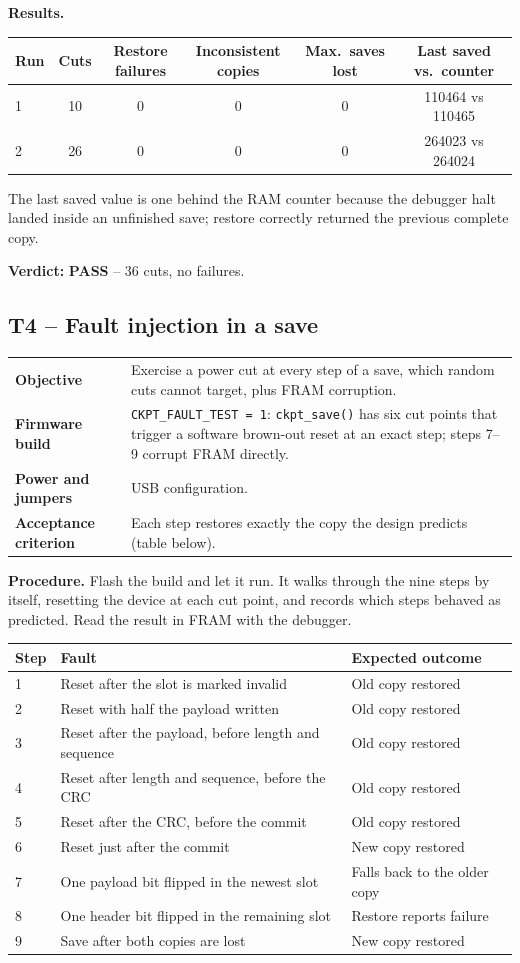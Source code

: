 \documentclass[11pt,a4paper]{article}
\makeatletter
\newcommand{\code}[1]{\texttt{#1}}
\newcommand{\pass}{\textbf{\textcolor{green!45!black}{PASS}}}
\newcommand{\testcase}[7]{%
  \subsection{#1 -- #2}\label{#3}
  \noindent\begin{tabularx}{\textwidth}{@{}>{\raggedright\arraybackslash\bfseries}p{3.6cm}L@{}}
  \toprule
  Objective & #4 \\
  Firmware build & #5 \\
  Power and jumpers & #6 \\
  Acceptance criterion & #7 \\
  \bottomrule
  \end{tabularx}\par\medskip}
\makeatother
\begin{document}
\textbf{Results.}
\begin{table}[H]
\centering\small
\begin{tabular}{@{}lccccc@{}}
\toprule
Run & Cuts & Restore failures & Inconsistent copies & Max.\ saves lost & Last saved vs.\ counter \\
\midrule
1 & 10 & 0 & 0 & 0 & 110464 vs 110465 \\
2 & 26 & 0 & 0 & 0 & 264023 vs 264024 \\
\bottomrule
\end{tabular}
\end{table}
The last saved value is one behind the RAM counter because the debugger halt landed inside an unfinished save; restore correctly returned the previous complete copy.

\textbf{Verdict:} \pass{} -- 36 cuts, no failures.

\testcase{T4}{Fault injection in a save}{t:fault}
  {Exercise a power cut at every step of a save, which random cuts cannot target, plus FRAM corruption.}
  {\code{CKPT\_FAULT\_TEST = 1}: \code{ckpt\_save()} has six cut points that trigger a software brown-out reset at an exact step; steps 7--9 corrupt FRAM directly.}
  {USB configuration.}
  {Each step restores exactly the copy the design predicts (table below).}

\textbf{Procedure.} Flash the build and let it run. It walks through the nine steps by itself, resetting the device at each cut point, and records which steps behaved as predicted. Read the result in FRAM with the debugger.

\begin{table}[H]
\centering\small
\begin{tabularx}{\textwidth}{@{}lLl@{}}
\toprule
Step & Fault & Expected outcome \\
 & Reset after the slot is marked invalid & Old copy restored \\
2 & Reset with half the payload written & Old copy restored \\
3 & Reset after the payload, before length and sequence & Old copy restored \\
4 & Reset after length and sequence, before the CRC & Old copy restored \\
5 & Reset after the CRC, before the commit & Old copy restored \\
6 & Reset just after the commit & New copy restored \\
7 & One payload bit flipped in the newest slot & Falls back to the older copy \\
8 & One header bit flipped in the remaining slot & Restore reports failure \\
9 & Save after both copies are lost & New copy restored \\
\bottomrule
\end{tabularx}
\end{table}
\end{document}

